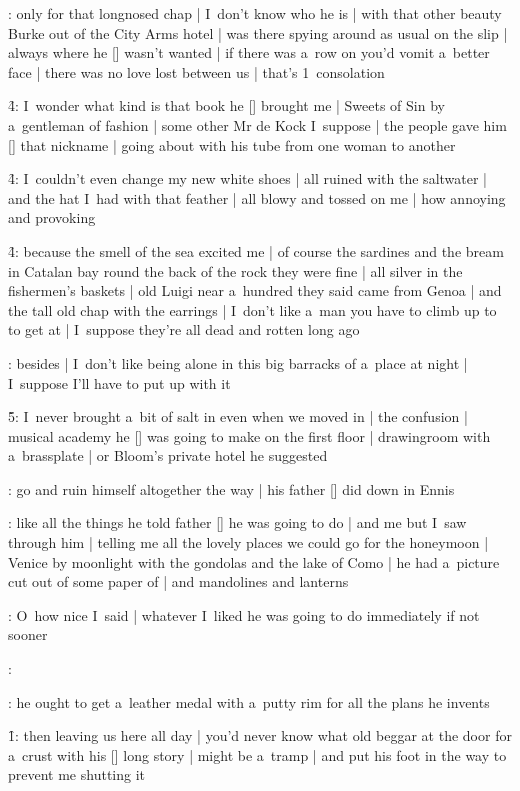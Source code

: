 :
only for that longnosed chap |
I~don't know who he is |
with that other beauty Burke out of the City Arms hotel |
was there spying around as usual on the slip |
always where he [\burke] wasn't wanted |
if there was a~row on you'd vomit a~better face |
there was no love lost between us |
that's 1~consolation

\f4:
I~wonder what kind is that book he [\bloom] brought me |
Sweets of Sin by a~gentleman of fashion |
some other Mr de Kock I~suppose |
the people gave him [\gentfash] that nickname |
going about with his tube from one woman to another

\f4:
I~couldn't even change my new white shoes |
all ruined with the saltwater |
and the hat I~had with that feather |
all blowy and tossed on me |
how annoying and provoking

\f4:
because the smell of the sea excited me |
of course the sardines and the bream in Catalan bay
round the back of the rock
they were fine |
all silver in the fishermen's baskets |
old Luigi near a~hundred they said came from Genoa |
and the tall old chap with the earrings |
I~don't like a~man you have to climb up to to get at |
I~suppose they're all dead and rotten long ago

:
besides |
I~don't like being alone in this big barracks of a~place at night |
I~suppose I'll have to put up with it

\f5:
I~never brought a~bit of salt in even when we moved in |
the confusion |
musical academy he [\bloom] was going to make on the first floor |
drawingroom with a~brassplate |
or Bloom's private hotel he suggested

:
go and ruin himself altogether the way |
his father [\bloomDa] did down in Ennis

:
like all the things he told father [\father] he was going to do |
and me but I~saw through him |
telling me all the lovely places we could go for the honeymoon |
Venice by moonlight with the gondolas and the lake of Como |
he had a~picture cut out of some paper of |
and mandolines and lanterns

:
O~how nice I~said |
whatever I~liked he was going to do immediately if not sooner

:

:
he ought to get a~leather medal with a~putty rim for all the plans he invents

\f1:
then leaving us here all day |
you'd never know what old beggar at the door for a~crust
with his [\beggar] long story |
might be a~tramp |
and put his foot in the way to prevent me shutting it

